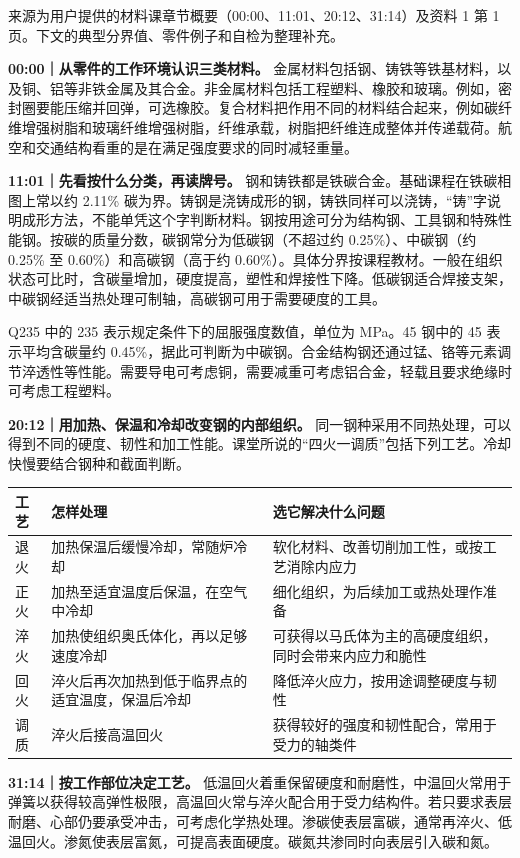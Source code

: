 \documentclass[zihao=5,a4paper,UTF8,fontset=fandol]{ctexart}
\begin{document}
来源为用户提供的材料课章节概要（00:00、11:01、20:12、31:14）及资料 1 第 1 页。下文的典型分界值、零件例子和自检为整理补充。


\textbf{00:00｜从零件的工作环境认识三类材料。} 金属材料包括钢、铸铁等铁基材料，以及铜、铝等非铁金属及其合金。非金属材料包括工程塑料、橡胶和玻璃。例如，密封圈要能压缩并回弹，可选橡胶。复合材料把作用不同的材料结合起来，例如碳纤维增强树脂和玻璃纤维增强树脂，纤维承载，树脂把纤维连成整体并传递载荷。航空和交通结构看重的是在满足强度要求的同时减轻重量。


\textbf{11:01｜先看按什么分类，再读牌号。} 钢和铸铁都是铁碳合金。基础课程在铁碳相图上常以约 2.11\% 碳为界。铸钢是浇铸成形的钢，铸铁同样可以浇铸，“铸”字说明成形方法，不能单凭这个字判断材料。钢按用途可分为结构钢、工具钢和特殊性能钢。按碳的质量分数，碳钢常分为低碳钢（不超过约 0.25\%）、中碳钢（约 0.25\% 至 0.60\%）和高碳钢（高于约 0.60\%）。具体分界按课程教材。一般在组织状态可比时，含碳量增加，硬度提高，塑性和焊接性下降。低碳钢适合焊接支架，中碳钢经适当热处理可制轴，高碳钢可用于需要硬度的工具。


Q235 中的 235 表示规定条件下的屈服强度数值，单位为 MPa。45 钢中的 45 表示平均含碳量约 0.45\%，据此可判断为中碳钢。合金结构钢还通过锰、铬等元素调节淬透性等性能。需要导电可考虑铜，需要减重可考虑铝合金，轻载且要求绝缘时可考虑工程塑料。


\textbf{20:12｜用加热、保温和冷却改变钢的内部组织。} 同一钢种采用不同热处理，可以得到不同的硬度、韧性和加工性能。课堂所说的“四火一调质”包括下列工艺。冷却快慢要结合钢种和截面判断。


\begin{longtable}{p{4.86cm}p{4.86cm}p{4.86cm}}
\toprule
工艺 & 怎样处理 & 选它解决什么问题 \\

\midrule
\endhead
退火 & 加热保温后缓慢冷却，常随炉冷却 & 软化材料、改善切削加工性，或按工艺消除内应力 \\
正火 & 加热至适宜温度后保温，在空气中冷却 & 细化组织，为后续加工或热处理作准备 \\
淬火 & 加热使组织奥氏体化，再以足够速度冷却 & 可获得以马氏体为主的高硬度组织，同时会带来内应力和脆性 \\
回火 & 淬火后再次加热到低于临界点的适宜温度，保温后冷却 & 降低淬火应力，按用途调整硬度与韧性 \\
调质 & 淬火后接高温回火 & 获得较好的强度和韧性配合，常用于受力的轴类件 \\
\bottomrule
\end{longtable}

\textbf{31:14｜按工作部位决定工艺。} 低温回火着重保留硬度和耐磨性，中温回火常用于弹簧以获得较高弹性极限，高温回火常与淬火配合用于受力结构件。若只要求表层耐磨、心部仍要承受冲击，可考虑化学热处理。渗碳使表层富碳，通常再淬火、低温回火。渗氮使表层富氮，可提高表面硬度。碳氮共渗同时向表层引入碳和氮。
\end{document}
